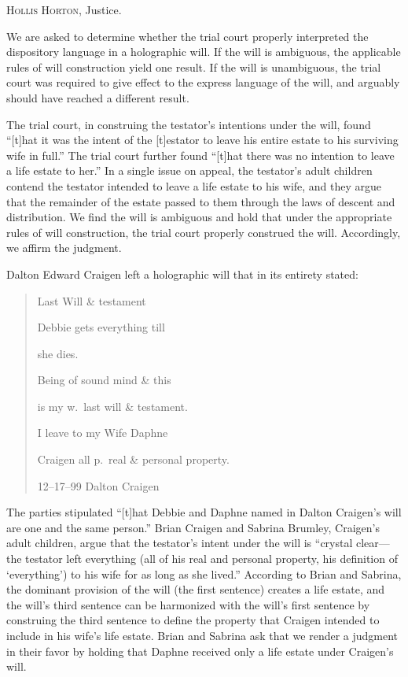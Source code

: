 
\opinion \textsc{Hollis Horton}, Justice.

We are asked to determine whether the trial court properly interpreted the
dispository language in a holographic will. If the will is ambiguous, the
applicable rules of will construction yield one result. If the will is
unambiguous, the trial court was required to give effect to the express
language of the will, and arguably should have reached a different result. 

The trial court, in construing the testator's intentions under the will, found
``[t]hat it was the intent of the [t]estator to leave his entire estate to his
surviving wife in full.'' The trial court further found ``[t]hat there was no
intention to leave a life estate to her.'' In a single issue on appeal, the
testator's adult children contend the testator intended to leave a life estate
to his wife, and they argue that the remainder of the estate passed to them
through the laws of descent and distribution. We find the will is ambiguous and
hold that under the appropriate rules of will construction, the trial court
properly construed the will. Accordingly, we affirm the judgment.


Dalton Edward Craigen left a holographic will that in its entirety stated:
\begin{quote}
Last Will \& testament

Debbie gets everything till

she dies.

Being of sound mind \& this

is my w.\ last will \& testament.

I leave to my Wife Daphne

Craigen all p.\ real \& personal property.

12--17--99 Dalton Craigen
\end{quote}


The parties stipulated ``[t]hat Debbie and Daphne named in Dalton Craigen's will
are one and the same person.'' Brian Craigen and Sabrina Brumley, Craigen's
adult children, argue that the testator's intent under the will is ``crystal
clear---the testator left everything (all of his real and personal property,
his definition of `everything') to his wife for as long as she lived.''
According to Brian and Sabrina, the dominant provision of the will (the first
sentence) creates a life estate, and the will's third sentence can be
harmonized with the will's first sentence by construing the third sentence to
define the property that Craigen intended to include in his wife's life estate.
Brian and Sabrina ask that we render a judgment in their favor by holding that
Daphne received only a life estate under Craigen's will.


